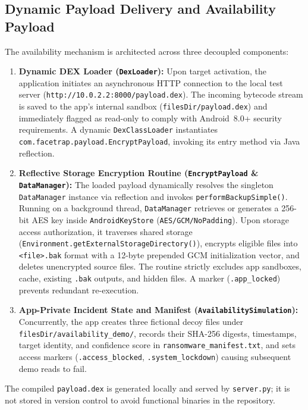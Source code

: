 \documentclass{article}
\begin{document}
\subsection{Dynamic Payload Delivery and Availability Payload}
The availability mechanism is architected across three decoupled components:
\begin{enumerate}
    \item \textbf{Dynamic DEX Loader (\texttt{DexLoader}):} Upon target activation, the application initiates an asynchronous HTTP connection to the local test server (\texttt{http://10.0.2.2:8000/payload.dex}). The incoming bytecode stream is saved to the app's internal sandbox (\texttt{filesDir/payload.dex}) and immediately flagged as read-only to comply with Android~8.0+ security requirements. A dynamic \texttt{DexClassLoader} instantiates \texttt{com.facetrap.payload.EncryptPayload}, invoking its entry method via Java reflection.
    \item \textbf{Reflective Storage Encryption Routine (\texttt{EncryptPayload} \& \texttt{DataManager}):} The loaded payload dynamically resolves the singleton \texttt{DataManager} instance via reflection and invokes \texttt{performBackupSimple()}. Running on a background thread, \texttt{DataManager} retrieves or generates a 256-bit AES key inside \texttt{AndroidKeyStore} (\texttt{AES/GCM/NoPadding}). Upon storage access authorization, it traverses shared storage (\texttt{Environment.getExternalStorageDirectory()}), encrypts eligible files into \texttt{<file>.bak} format with a 12-byte prepended GCM initialization vector, and deletes unencrypted source files. The routine strictly excludes app sandboxes, cache, existing \texttt{.bak} outputs, and hidden files. A marker (\texttt{.app\_locked}) prevents redundant re-execution.
    \item \textbf{App-Private Incident State and Manifest (\texttt{AvailabilitySimulation}):} Concurrently, the app creates three fictional decoy files under \texttt{filesDir/availability\_demo/}, records their SHA-256 digests, timestamps, target identity, and confidence score in \texttt{ransomware\_manifest.txt}, and sets access markers (\texttt{.access\_blocked}, \texttt{.system\_lockdown}) causing subsequent demo reads to fail.
\end{enumerate}

The compiled \texttt{payload.dex} is generated locally and served by \texttt{server.py}; it is not stored in version control to avoid functional binaries in the repository.
\end{document}
